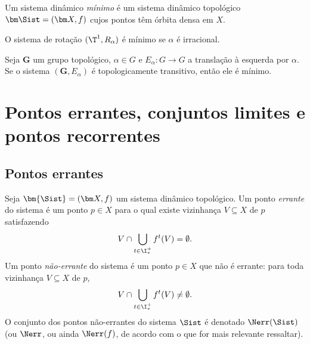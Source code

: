 \begin{definition}
Um sistema dinâmico \emph{mínimo} é um sistema dinâmico topológico $\bm\Sist=(\bm X,f)$ cujos pontos têm órbita densa em $X$.
\end{definition}




\begin{proposition}
O sistema de rotação $(\T^1,R_\alpha)$ é mínimo se $\alpha$ é irracional.
\end{proposition}



\begin{proposition}
Seja $\bm G$ um grupo topológico, $\alpha \in G$ e $E_\alpha\colon G \to G$ a translação à esquerda por $\alpha$. Se o sistema $(\bm G, E_\alpha)$ é topologicamente transitivo, então ele é mínimo.
\end{proposition}



\section{Pontos errantes, conjuntos limites e pontos recorrentes}


\subsection{Pontos errantes}

\begin{definition}
Seja $\bm{\Sist}=(\bm X,f)$ um sistema dinâmico topológico. Um ponto \emph{errante} do sistema é um ponto $p \in X$ para o qual existe vizinhança $V \subseteq X$ de $p$ satisfazendo
	\begin{equation*}
	V \cap \bigcup_{t \in \I^+_*}f^t(V) = \emptyset.
	\end{equation*}
Um ponto \emph{não-errante} do sistema é um ponto $p \in X$ que não é errante: para toda vizinhança $V \subseteq X$ de $p$,
	\begin{equation*}
	V \cap \bigcup_{t \in \I^+_*}f^t(V) \neq \emptyset.
	\end{equation*}
O conjunto dos pontos não-errantes do sistema $\Sist$ é denotado $\Nerr(\Sist)$ (ou $\Nerr$, ou ainda $\Nerr(f)$, de acordo com o que for mais relevante ressaltar).
\end{definition}

